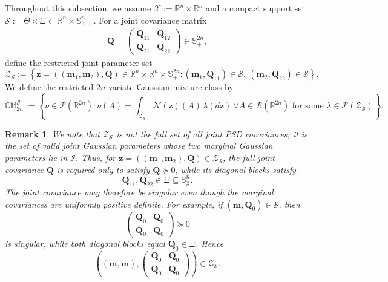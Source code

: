 \documentclass[opre,sglanonrev]{informs4}
\newtheorem{remark}{Remark}
\newcommand{\mN}{\mathcal{N}}
\newcommand{\mX}{\mathcal{X}}
\newcommand{\mbR}{\mathbb R}
\newcommand{\mbS}{\mathbb S}
\newcommand{\mbGM}{\mathbb{GM}}
\newcommand{\bmean}{\bm{m}}
\newcommand{\bz}{\bm{z}}
\newcommand{\bQ}{\bm Q}
\begin{document}
{\begin{APPENDICES}
Throughout this subsection, we assume \(\mX:=\mbR^n\times\mbR^n\) and a compact support set $\mathcal S:=\Theta\times\Xi\subset \mbR^n\times\mbS^n_{++}$. For a joint covariance matrix\vspace{-1.9em}
\begin{align}\label{def:Q-def-appndx}
    \bQ=
\begin{pmatrix}
\bQ_{11} & \bQ_{12}\\
\bQ_{21} & \bQ_{22}
\end{pmatrix}
\in\mbS^{2n}_+,
\end{align} define the restricted joint-parameter set
\[
\mathcal Z_{\mathcal S}
:=
\left\{
\bz=((\bmean_1,\bmean_2),\bQ)\in
\mbR^n\times\mbR^n\times\mbS^{2n}_+
:
(\bmean_1,\bQ_{11})\in\mathcal S,\ 
(\bmean_2,\bQ_{22})\in\mathcal S
\right\}.
\]
We define the restricted \(2n\)-variate Gaussian-mixture class by
\[
\mbGM_{2n}^{\mathcal S}
:=
\left\{
\nu\in\mathcal P(\mbR^{2n})
:
\nu(A)=\int_{\mathcal Z_{\mathcal S}}\mN(\bz)(A)\,\lambda(d\bz)
\ \forall A\in\mathcal B(\mbR^{2n})
\text{ for some }\lambda\in\mathcal P(\mathcal Z_{\mathcal S})
\right\}.
\]

\begin{remark}
    We note that \(\mathcal Z_{\mathcal S}\) is not the full set of all joint PSD
covariances; it is the set of valid joint Gaussian parameters whose two marginal
Gaussian parameters lie in \(\mathcal S\). Thus, for
\(\bz=((\bmean_1,\bmean_2),\bQ)\in\mathcal Z_{\mathcal S}\), the full joint
covariance \(\bQ\) is required only to satisfy \(\bQ\succeq0\), while its diagonal blocks satisfy
\[
\bQ_{11},\bQ_{22}\in\Xi\subseteq\mathbb S^n_{\hat\delta}.
\]
The joint covariance may therefore be singular even though the marginal
covariances are uniformly positive definite. For example, if
\((\bmean,\bQ_0)\in\mathcal S\), then
\[
\begin{pmatrix}
\bQ_0 & \bQ_0\\
\bQ_0 & \bQ_0
\end{pmatrix}
\succeq0
\]
is singular, while both diagonal blocks equal \(\bQ_0\in\Xi\). Hence
\[
((\bmean,\bmean),
\begin{pmatrix}
\bQ_0 & \bQ_0\\
\bQ_0 & \bQ_0
\end{pmatrix})
\in\mathcal Z_{\mathcal S}.
\]


\end{remark}
\end{APPENDICES}}
\end{document}
